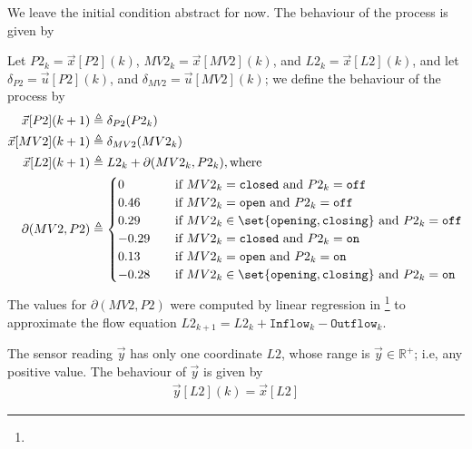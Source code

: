 {We leave the initial condition abstract for now. The behaviour of the process is given by

Let $P2_k=\vec{x}[P2](k)$, $MV2_k=\vec{x}[MV2](k)$, and $L2_k=\vec{x}[L2](k)$, and let $\delta_{P2}=\vec{u}[P2](k)$, and $\delta_{MV2}=\vec{u}[MV2](k)$; we define the behaviour of the process by
\begin{align*}
\vec{x}[P2](k+1)&\triangleq \delta_{P2}(P2_k)\\
\vec{x}[MV2](k+1)&\triangleq \delta_{MV2}(MV2_k)\\
\vec{x}[L2](k+1)&\triangleq L2_k+\partial(MV2_k,P2_k),\text{where}\\
\partial(MV2,P2)&\triangleq
\begin{cases}
  0&\quad \text{if $MV2_k=\texttt{closed}$ and $P2_k=\texttt{off}$}\\
  0.46&\quad \text{if $MV2_k=\texttt{open}$ and $P2_k=\texttt{off}$}\\
  0.29&\quad \text{if $MV2_k\in\set{\texttt{opening},\texttt{closing}}$ and $P2_k=\texttt{off}$}\\
  -0.29&\quad \text{if $MV2_k=\texttt{closed}$ and $P2_k=\texttt{on}$}\\
  0.13&\quad \text{if $MV2_k=\texttt{open}$ and $P2_k=\texttt{on}$}\\
  -0.28&\quad \text{if $MV2_k\in\set{\texttt{opening},\texttt{closing}}$ and $P2_k=\texttt{on}$}\\  
\end{cases}
\end{align*}
The values for $\partial(MV2,P2)$ were computed by linear regression in \cite{John?}
\footnote{ } 
to approximate the flow equation $L2_{k+1}=L2_{k}+\texttt{Inflow}_k-\texttt{Outflow}_k$.

The sensor reading $\vec{y}$ has only one coordinate $L2$, whose range is $\vec{y}\in \mathbb{R}^+$; i.e, any positive value. The behaviour of $\vec{y}$ is given by 
\begin{align}
  \vec{y}[L2](k)=\vec{x}[L2]
\end{align}

}
